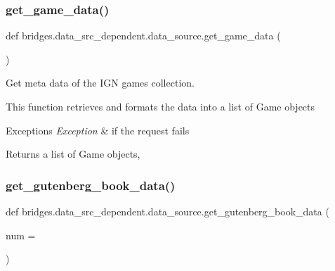 \mbox{\label{namespacebridges_1_1data__src__dependent_1_1data__source_a31b64b8c7a42cdfca0a5f0ae3da187d2}} 
\subsubsection{\texorpdfstring{get\_game\_data()}{get\_game\_data()}}
{\footnotesize\ttfamily def bridges.\+data\+\_\+src\+\_\+dependent.\+data\+\_\+source.\+get\+\_\+game\+\_\+data (\begin{DoxyParamCaption}{ }\end{DoxyParamCaption})}



Get meta data of the I\+GN games collection. 

This function retrieves and formats the data into a list of Game objects


\begin{DoxyExceptions}{Exceptions}
{\em Exception} & if the request fails\\
\hline
\end{DoxyExceptions}
\begin{DoxyReturn}{Returns}
a list of Game objects, 
\end{DoxyReturn}
\mbox{\label{namespacebridges_1_1data__src__dependent_1_1data__source_af377da50c8f4e488b832978908274089}} 
\subsubsection{\texorpdfstring{get\_gutenberg\_book\_data()}{get\_gutenberg\_book\_data()}}
{\footnotesize\ttfamily def bridges.\+data\+\_\+src\+\_\+dependent.\+data\+\_\+source.\+get\+\_\+gutenberg\+\_\+book\+\_\+data (\begin{DoxyParamCaption}\item[{}]{num = {} }\end{DoxyParamCaption})}



